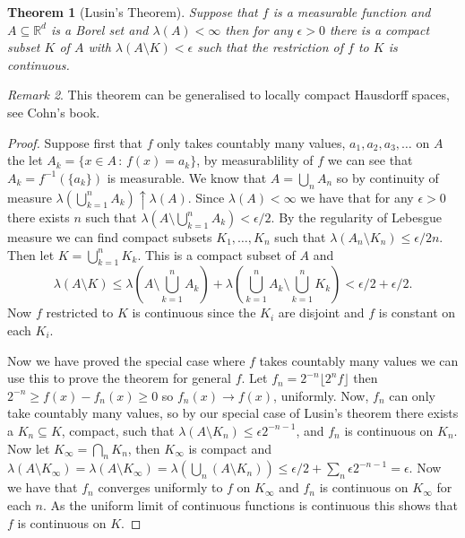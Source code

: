 \documentclass[11pt]{article}
\newtheorem{thm}{Theorem}[section]
\theoremstyle{definition}
\theoremstyle{remark}
\newtheorem{remark}[thm]{Remark}
\begin{document}
\begin{thm}[Lusin's Theorem]
Suppose that $f$ is a measurable function and $A \subseteq \mathbb{R}^d$ is a Borel set and $\lambda(A) < \infty$ then for any $\epsilon >0$ there is a compact subset $K$ of $A$ with $\lambda(A \setminus K) < \epsilon$ such that the restriction of $f$ to $K$ is continuous. 
\end{thm}
\begin{remark}
This theorem can be generalised to locally compact Hausdorff spaces, see Cohn's book.
\end{remark}
\begin{proof}
Suppose first that $f$ only takes countably many values, $a_1, a_2, a_3, \dots$ on $A$ the let $A_k = \{ x \in A \,:\, f(x) = a_k\}$, by measurablility of $f$ we can see that $A_k = f^{-1}(\{a_k\})$ is measurable. We know that $A = \bigcup_n A_n$ so by continuity of measure $\lambda(\bigcup_{k=1}^n A_k) \uparrow \lambda(A)$. Since $\lambda(A) < \infty$ we have that for any $\epsilon >0$ there exists $n$ such that $\lambda(A \setminus \bigcup_{k=1}^n A_k) < \epsilon/2$. By the regularity of Lebesgue measure we can find compact subsets $K_1, \dots, K_n$ such that $\lambda(A_n \setminus K_n) \leq \epsilon/2n$. Then let $K = \bigcup_{k=1}^n K_k$. This is a compact subset of $A$ and
\[ \lambda(A \setminus K) \leq \lambda(A\setminus \bigcup_{k=1}^n A_k) + \lambda(\bigcup_{k=1}^n A_k \setminus \bigcup_{k=1}^n K_k ) < \epsilon/2 + \epsilon/2. \]  Now $f$ restricted to $K$ is continuous since the $K_i$ are disjoint and $f$ is constant on each $K_i$.

Now we have proved the special case where $f$ takes countably many values we can use this to prove the theorem for general $f$. Let $f_n = 2^{-n} \lfloor 2^n f \rfloor$ then $2^{-n} \geq f(x)-f_n(x) \geq 0$ so $f_n(x) \rightarrow f(x)$, uniformly.  Now, $f_n$ can only take countably many values, so by our special case of Lusin's theorem there exists a $K_n \subseteq K$, compact, such that $\lambda(A \setminus K_n) \leq \epsilon 2^{-n-1}$, and $f_n$ is continuous on $K_n$. Now let $K_\infty = \bigcap_n K_n$, then $K_\infty$ is compact and $\lambda(A \setminus K_\infty) =  \lambda(A \setminus K_\infty) =  \lambda (\bigcup_n(A \setminus K_n)) \leq \epsilon/2 + \sum_n \epsilon 2^{-n-1} = \epsilon$. Now we have that $f_n$ converges uniformly to $f$ on $K_\infty$ and $f_n$ is continuous on $K_\infty$ for each $n$. As the uniform limit of continuous functions is continuous this shows that $f$ is continuous on $K$. 


\end{proof}
\end{document}
